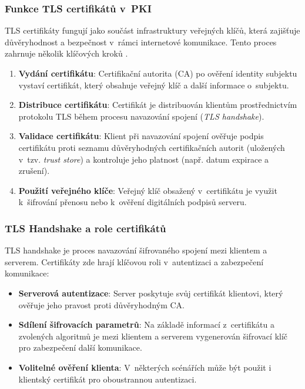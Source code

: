 \subsubsection*{Funkce TLS certifikátů v~PKI}
TLS certifikáty fungují jako součást infrastruktury veřejných klíčů, která zajišťuje důvěryhodnost a bezpečnost v~rámci internetové komunikace. Tento proces zahrnuje několik klíčových kroků \cite{cooper2008x509, stallings2017cryptography}.
\begin{enumerate}
    \item \textbf{Vydání certifikátu}: Certifikační autorita (CA) po ověření identity subjektu vystaví certifikát, který obsahuje veřejný klíč a další informace o~subjektu.
    \item \textbf{Distribuce certifikátu}: Certifikát je distribuován klientům prostřednictvím protokolu TLS během procesu navazování spojení (\emph{TLS handshake}).
    \item \textbf{Validace certifikátu}: Klient při navazování spojení ověřuje podpis certifikátu proti seznamu důvěryhodných certifikačních autorit (uložených v~tzv. \emph{trust store}) a kontroluje jeho platnost (např. datum expirace a zrušení).
    \item \textbf{Použití veřejného klíče}: Veřejný klíč obsažený v~certifikátu je využit k~šifrování přenosu nebo k~ověření digitálních podpisů serveru.
\end{enumerate}

\subsubsection*{TLS Handshake a role certifikátů}
TLS handshake je proces navazování šifrovaného spojení mezi klientem a serverem. Certifikáty zde hrají klíčovou roli v~autentizaci a zabezpečení komunikace: \cite{rescorla2018tls13, stallings2017cryptography}
\begin{itemize}
    \item \textbf{Serverová autentizace}: Server poskytuje svůj certifikát klientovi, který ověřuje jeho pravost proti důvěryhodným CA.
    \item \textbf{Sdílení šifrovacích parametrů}: Na základě informací z~certifikátu a zvolených algoritmů je mezi klientem a serverem vygenerován šifrovací klíč pro zabezpečení další komunikace.
    \item \textbf{Volitelné ověření klienta}: V~některých scénářích může být použit i klientský certifikát pro oboustrannou autentizaci.
\end{itemize}

